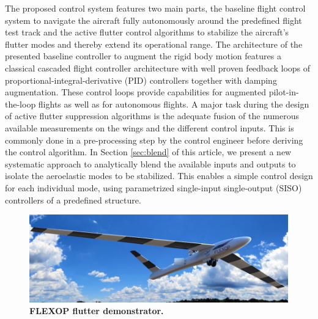 \documentclass[aerospace,article,submit,moreauthors,pdftex,10pt,a4paper]{Definitions/mdpi}
\begin{document}
The proposed control system features two main parts, the baseline flight control system to navigate the aircraft fully autonomously around the predefined flight test track and the active flutter control algorithms to stabilize the aircraft's flutter modes and thereby extend its operational range.
The architecture of the presented baseline controller to augment the rigid body motion features a classical cascaded flight controller architecture \cite{brock11,Stevens15} with well proven feedback loops of proportional-integral-derivative (PID) controllers together with damping augmentation. These control loops provide capabilities for augmented pilot-in-the-loop flights  as well as for autonomous flights.  A major task during the design of active flutter suppression algorithms is the adequate fusion of the numerous available measurements on the wings and the different control inputs. This is commonly done in a  pre-processing step by the control engineer before deriving the control algorithm. 
In Section \ref{sec:blend} of this article,  we present a new systematic  approach to analytically blend the available inputs and outputs to isolate the aeroelastic modes to be stabilized. This enables a simple control design for each individual mode, using parametrized single-input single-output (SISO) controllers of a predefined structure.
\begin{figure}
	\centering
	\includegraphics[width=1\linewidth]{figs/ac.jpg}
	\caption{\textbf{FLEXOP flutter demonstrator.}}
	\label{fig:ac}
\end{figure}
\end{document}
